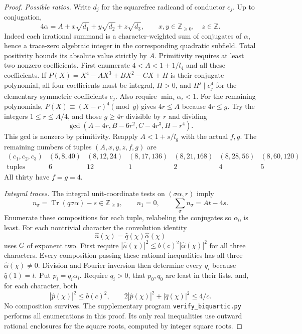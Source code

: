 \documentclass[11pt,a4paper]{article}
\numberwithin{equation}{section}
\begin{document}
\begin{proof}
\medskip\noindent\emph{Possible ratios.}
Write $d_j$ for the squarefree radicand of conductor $c_j$. Up to
conjugation,
\[
 4\alpha=A+x\sqrt{d_1}+y\sqrt{d_2}+z\sqrt{d_3},
 \qquad x,y\in\mathbb Z_{\ge0},\quad z\in\mathbb Z .
\]
Indeed each irrational summand is a character-weighted sum of
conjugates of $\alpha$, hence a trace-zero algebraic integer in the
corresponding quadratic subfield. Total positivity bounds its absolute
value strictly by $A$. Primitivity requires at least two nonzero
coefficients. First enumerate $4<A<1+1/l_4$ and all these coefficients.
If $P(X)=X^4-AX^3+BX^2-CX+H$ is their conjugate polynomial, all
four coefficients must be integral, $H>0$, and
$H^j\mid e_j^4$ for the elementary symmetric coefficients $e_j$.
Also require $\min_i\alpha_i<1$. For the remaining polynomials,
$P(X)\equiv(X-r)^4\pmod g$ gives $4r\le A$ because $4r\le g$.
Try the integers $1\le r\le A/4$, and those $g\ge4r$ divisible by
$r$ and dividing
\[
 \gcd(A-4r,B-6r^2,C-4r^3,H-r^4).
\]
This gcd is nonzero by primitivity. Reapply $A<1+s/l_g$ with the
actual $f,g$. The remaining numbers of tuples $(A,x,y,z,f,g)$ are
\[
\begin{array}{c|rrrrrr}
(c_1,c_2,c_3)&(5,8,40)&(8,12,24)&(8,17,136)&(8,21,168)&(8,28,56)&(8,60,120)\\\hline
\text{tuples}&6&12&1&2&4&5
\end{array}
\]
All thirty have $f=g=4$.

\medskip\noindent\emph{Integral traces.}
The integral unit-coordinate tests on
$(\sigma\alpha,r)$ imply
\[
 n_\sigma=\operatorname{Tr}(q\sigma\alpha)-s\in\mathbb Z_{\ge0},
 \qquad n_1=0,\qquad\sum_\sigma n_\sigma=At-4s.
\]
Enumerate these compositions for each tuple, relabeling the conjugates
so $\alpha_0$ is least. For each nontrivial character the convolution
identity
\[
 \widehat n(\chi)=\widehat q(\chi)\widehat\alpha(\chi)
\]
uses $G$ of exponent two. First require
$|\widehat n(\chi)|^2\le b(c)^2|\widehat\alpha(\chi)|^2$ for all
three characters. Every composition passing these rational inequalities
has all three $\widehat\alpha(\chi)\ne0$. Division and Fourier inversion
then determine every $q_i$ because $\widehat q(1)=t$. Put $p_i=q_i\alpha_i$.
Require $q_i>0$, that $p_0,q_0$ are least in their lists, and, for each
character, both
\[
 |\widehat p(\chi)|^2\le b(c)^2,\qquad
 2|\widehat p(\chi)|^2+|\widehat q(\chi)|^2\le4/c.
\]
No composition survives. The supplementary program
\texttt{verify\_biquartic.py} performs all enumerations in this proof.
Its only real inequalities use outward rational enclosures for the
square roots, computed by integer square roots.
\end{proof}
\end{document}
